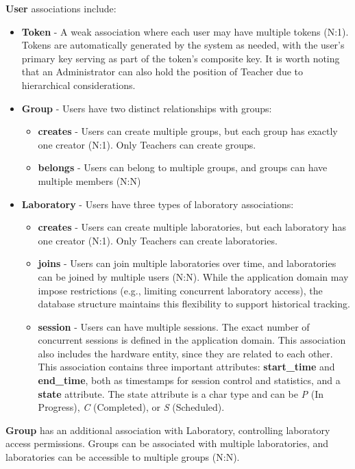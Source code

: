 \textbf{User} associations include:
\begin{itemize}
    \item \textbf{Token} - A weak association where each user may have multiple tokens (N:1). Tokens are automatically generated by the system as needed, with the user's primary key serving as part of the token's composite key. It is worth noting that an Administrator can also hold the position of Teacher due to hierarchical considerations.
    \item \textbf{Group} - Users have two distinct relationships with groups:
    \begin{itemize}
        \item \textbf{creates} - Users can create multiple groups, but each group has exactly one creator (N:1). Only Teachers can create groups.
        \item \textbf{belongs} - Users can belong to multiple groups, and groups can have multiple members (N:N)
    \end{itemize}
    \item \textbf{Laboratory} - Users have three types of laboratory associations:
    \begin{itemize}
        \item \textbf{creates} - Users can create multiple laboratories, but each laboratory has one creator (N:1). Only Teachers can create laboratories.
        \item \textbf{joins} - Users can join multiple laboratories over time, and laboratories can be joined by multiple users (N:N). While the application domain may impose restrictions (e.g., limiting concurrent laboratory access), the database structure maintains this flexibility to support historical tracking.
        \item \textbf{session} - Users can have multiple sessions. The exact number of concurrent sessions is defined in the application domain. This association also includes the hardware entity, since they are related to each other. This association contains three important attributes: \textbf{start\_time} and \textbf{end\_time}, both as timestamps for session control and statistics, and a \textbf{state} attribute. The state attribute is a char type and can be \textit{P} (In Progress), \textit{C} (Completed), or \textit{S} (Scheduled).
    \end{itemize}
\end{itemize}

\textbf{Group} has an additional association with Laboratory, controlling laboratory access permissions. Groups can be associated with multiple laboratories, and laboratories can be accessible to multiple groups (N:N).

